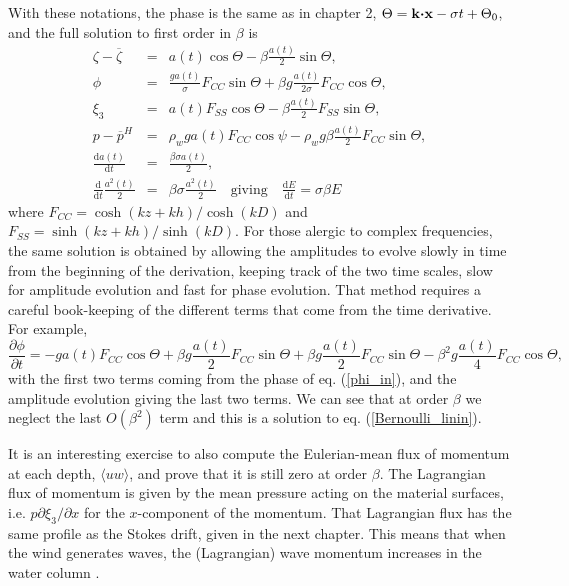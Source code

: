With these notations, the phase is the same as in chapter 2, $\Theta = {\mathbf k}\mbox{\boldmath $\cdot$}{\mathbf x} - \sigma t + \Theta_0$, and  the full solution to first order in $\beta$ is
\begin{eqnarray}
    \zeta-\overline{\zeta}&=&   a(t) \cos \Theta - \beta \frac{a(t)}{2}  \sin \Theta, \\
    \phi &=& \frac{g a(t)}{\sigma} F_{CC} \sin \Theta + \beta g \frac{a(t)}{2 \sigma}  F_{CC}  \cos \Theta , \label{phi_in} \\
    \xi_3 &=&  a(t)  F_{SS} \cos \Theta - \beta \frac{a(t)}{2}  F_{SS}  \sin \Theta , \label{phi_in} \\
    p-\overline{p}^H &=&   \rho_w g a(t) F_{CC} \cos \psi -\rho_w g \beta  \frac{a(t)}{2}  F_{CC} \sin\Theta, \\
    \frac{{\mathrm d} a(t)}{{\mathrm d} t}&=&\frac{\beta \sigma a(t)}{2}, \\
    \frac{{\mathrm d}}{{\mathrm d} t}\frac{a^2(t)}{2} &=&\beta \sigma
    \frac{a^2(t)}{2}  \quad \mathrm{giving} \quad \frac{{\mathrm d} E}{{\mathrm d} t}= \sigma \beta  E  \label{eq:energy_wind_growth}
\end{eqnarray}
where $F_{CC}=\cosh(kz+kh)/\cosh(kD)$ and $F_{SS}=\sinh(kz+kh)/\sinh(kD)$. For those alergic to complex frequencies, the same solution is obtained by allowing the amplitudes to evolve slowly in time from the beginning of the derivation, keeping track of the two time scales, slow for amplitude evolution and fast for phase evolution. That method requires a careful book-keeping of the different terms that come from the time derivative. For example, 
\begin{equation}
   \frac{\partial \phi}{\partial t} = - g a(t) F_{CC} \cos \Theta + \beta g \frac{a(t)}{2}  F_{CC}  \sin
    \Theta  + \beta g \frac{a(t)}{2 }  F_{CC}  \sin \Theta -  \beta^2 g \frac{a(t)}{4}  F_{CC}  \cos \Theta,
\end{equation}
with the first two terms coming from the phase of eq. (\ref{phi_in}), and the amplitude evolution giving the last two terms. We can see that at order $\beta$ we neglect the last $O(\beta^2)$ term and this is a solution to eq. (\ref{Bernoulli_linin}). 


It is an interesting exercise to also compute the Eulerian-mean flux of momentum at each depth,  $\langle u w \rangle$, and prove that 
it is still zero at order $\beta$. The Lagrangian flux of momentum is given by the mean pressure acting on the material surfaces, i.e. $ p \partial \xi_3/\partial x$  for the $x$-component of the momentum. That Lagrangian flux has the same profile as the Stokes drift, given in the next chapter. This means that when the wind generates waves, the (Lagrangian) wave momentum increases in the water column \citep{Ardhuin&al.2008b}. 

